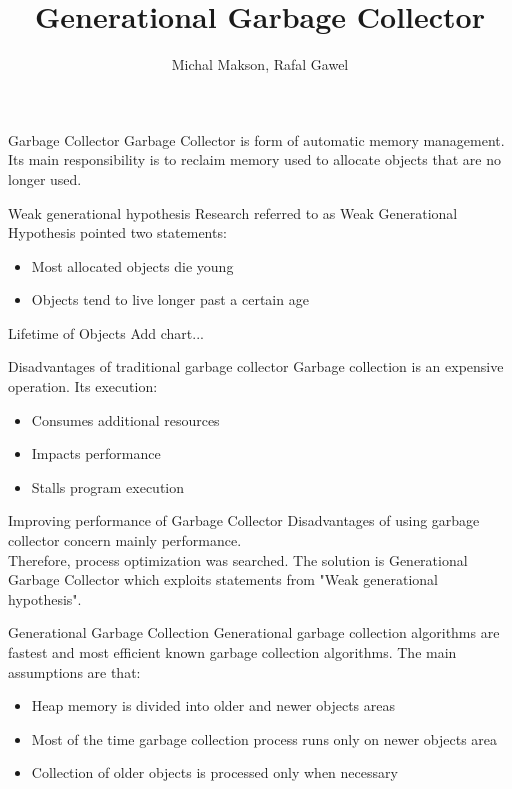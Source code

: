 \documentclass[presentation]{beamer}
\title{Generational Garbage Collector}
\author{Michal Makson, Rafal Gawel}
\institute{AGH}
\date{}
\begin{document}
\begin{frame}
  \titlepage
\end{frame}

\begin{frame}{Garbage Collector}
Garbage Collector is form of automatic memory management.\\
Its main responsibility is to reclaim memory used to allocate objects that are no longer used.
\end{frame}

\begin{frame}{Weak generational hypothesis}
	Research referred to as Weak Generational Hypothesis
	pointed two statements:
	\newline
	\begin{itemize}
		\item Most allocated objects die young
		\item Objects tend to live longer past a certain age
	\end{itemize}
\end{frame}

\begin{frame}{Lifetime of Objects}
Add chart...
\end{frame}

\begin{frame}{Disadvantages of traditional garbage collector}
	Garbage collection is an expensive operation.
	Its execution:
	\newline
	\begin{itemize}
		\item Consumes additional resources
		\item Impacts performance
		\item Stalls program execution
	\end{itemize}
	
\end{frame}

\begin{frame}{Improving performance of Garbage Collector}
	Disadvantages of using garbage collector concern mainly performance. 
	\\Therefore, process optimization was searched.
	\newline
	The solution is Generational Garbage Collector which exploits statements from "Weak generational hypothesis".
\end{frame}


\begin{frame}{Generational Garbage Collection}
	Generational garbage collection algorithms are fastest and most efficient known garbage collection algorithms.
	 The main assumptions are that:
	 \newline
	 \begin{itemize}
	 	\item Heap memory is divided into older and newer objects areas
	 	\item Most of the time garbage collection process runs only on newer objects area
	 	\item Collection of older objects is processed only when necessary
	 \end{itemize}
\end{frame}
\end{document}
